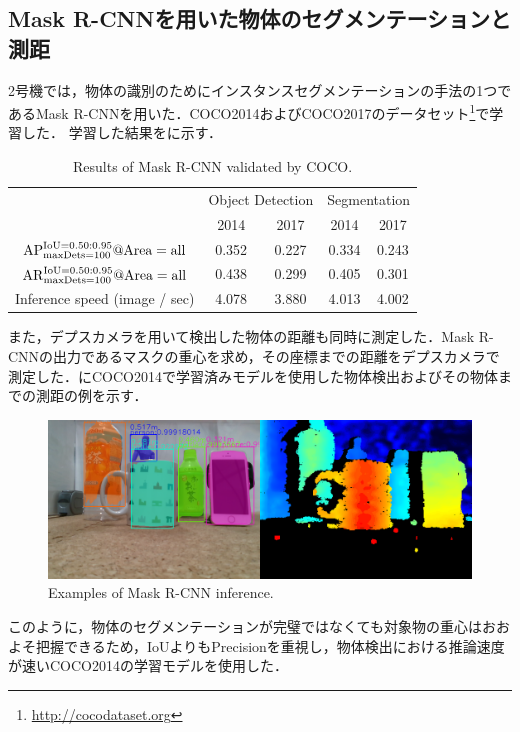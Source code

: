 \subsection{Mask R-CNNを用いた物体のセグメンテーションと測距}\label{sec:mrcnn学習}
2号機では，物体の識別のためにインスタンスセグメンテーションの手法の1つであるMask R-CNNを用いた．COCO2014およびCOCO2017のデータセット\footnote{\url{http://cocodataset.org}}で学習した．
学習した結果をに示す．

\begin{table}[H]
    \centering
    \caption{Results of Mask R-CNN validated by COCO.}
    \begin{tabular}{ccccc}\toprule
        & \multicolumn{2}{c}{Object Detection} & \multicolumn{2}{c}{Segmentation} \\ 
        & 2014 & 2017 & 2014 & 2017 \\ \midrule
        $\rm{AP}^{\rm{IoU}=0.50:0.95} _{\rm maxDets=100} @Area=all$ & 0.352 & 0.227 & 0.334 & 0.243 \\ 
        $\rm{AR}^{\rm{IoU}=0.50:0.95} _{\rm maxDets=100} @Area=all$ & 0.438 & 0.299 & 0.405 & 0.301 \\ 
        Inference speed (image / sec) & 4.078 & 3.880 & 4.013 & 4.002 \\ \bottomrule
    \end{tabular} 
    \label{tab:MSCOCO評価}
\end{table}

また，デプスカメラを用いて検出した物体の距離も同時に測定した．Mask R-CNNの出力であるマスクの重心を求め，その座標までの距離をデプスカメラで測定した．にCOCO2014で学習済みモデルを使用した物体検出およびその物体までの測距の例を示す．

\begin{figure}[H]
    \centering
    \includegraphics[width=0.7\linewidth]{figure/chapter4/MaskR-CNN_screenshot}
    \caption{Examples of Mask R-CNN inference.}
    \label{fig:maskrcnn例}
\end{figure}

このように，物体のセグメンテーションが完璧ではなくても対象物の重心はおおよそ把握できるため，IoUよりもPrecisionを重視し，物体検出における推論速度が速いCOCO2014の学習モデルを使用した．


